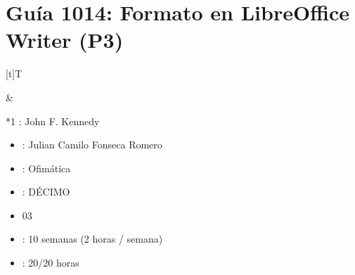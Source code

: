 \documentclass[letterpaper,10pt,spanish]{sphinxmanual}
\begin{document}
\sphinxstepscope


\section{Guía 1014: Formato en LibreOffice Writer (P3)}
\label{\detokenize{1_guias/10ofimatica/G1014:guia-1014-formato-en-libreoffice-writer-p3}}\label{\detokenize{1_guias/10ofimatica/G1014::doc}}

\begin{savenotes}\sphinxattablestart
\sphinxthistablewithglobalstyle
\centering
\begin{tabular}[t]{}
\sphinxtoprule
\sphinxtableatstartofbodyhook

\begin{savenotes}\sphinxattablestart
\sphinxthistablewithglobalstyle
\centering
\begin{tabulary}{\linewidth}[t]{T}
\sphinxtoprule
\sphinxtableatstartofbodyhook
\sphinxAtStartPar
{}
\\
\sphinxbottomrule
\end{tabulary}
\sphinxtableafterendhook\par
\sphinxattableend\end{savenotes}
&

\begin{savenotes}\sphinxattablestart
\sphinxthistablewithglobalstyle
\raggedright
\begin{tabular}[t]{*{1}{}}
\sphinxtoprule
\sphinxtableatstartofbodyhook
\sphinxAtStartPar
{}: John F. Kennedy
\begin{itemize}
\item {} 
\sphinxAtStartPar
{}: Julian Camilo Fonseca Romero

\item {} 
\sphinxAtStartPar
{}: Ofimática

\item {} 
\sphinxAtStartPar
{}: DÉCIMO

\item {} 
\sphinxAtStartPar
{} 03

\item {} 
\sphinxAtStartPar
{}: 10 semanas (2 horas / semana)

\item {} 
\sphinxAtStartPar
{}: 20/20 horas

\end{itemize}
\\
\sphinxbottomrule
\end{tabular}
\sphinxtableafterendhook\par
\sphinxattableend\end{savenotes}
\\
\sphinxbottomrule
\end{tabular}
\sphinxtableafterendhook\par
\sphinxattableend\end{savenotes}
\end{document}
